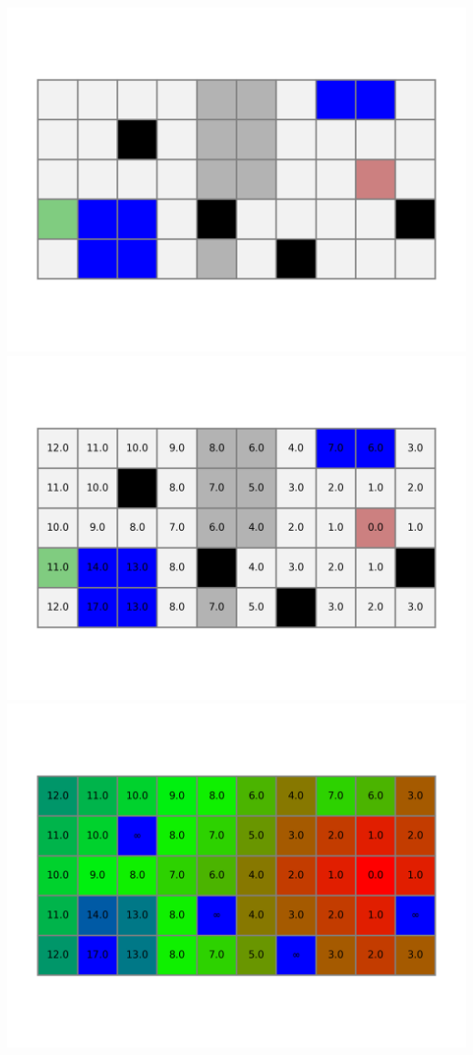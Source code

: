 \documentclass[11pt,class=report,crop=false]{standalone}
\begin{document}
\begin{center}
	\includegraphics[scale=\myscale,scale=0.33,trim={0 2cm 0 2cm},clip]{figures/terrain-01-1}
	\includegraphics[scale=\myscale,scale=0.33,trim={0 2cm 0 2cm},clip]{figures/terrain-01-2}
	\includegraphics[scale=\myscale,scale=0.33,trim={0 2cm 0 2cm},clip]{figures/terrain-01-3}
\end{center}
\end{document}
